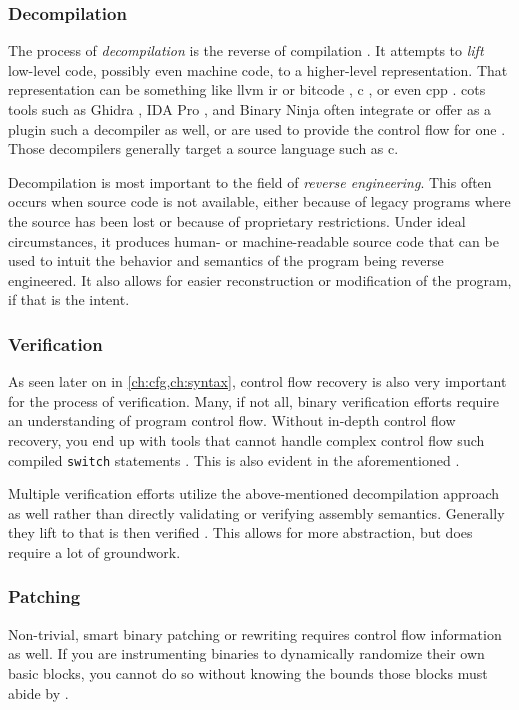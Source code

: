 \subsubsection{Decompilation}
The process of \emph{decompilation} is the reverse of compilation \autocite{cifuentes1994reverse}.
It attempts to \emph{lift} low-level code, possibly even machine code, to a higher-level representation.
That representation can be something like \gls{llvm} \ac{ir} or bitcode \autocite{dinaburg2014mcsema}, \gls{c} \autocite{brumley2013native}, or even \gls{cpp} \autocite{fokin2011smartdec}.
\Ac{cots} tools such as Ghidra \autocite{ghidra}, IDA Pro \autocite{ida-decompiler}, and Binary Ninja \autocite{binary-ninja-decompiler} often integrate or offer as a plugin such a decompiler as well, or are used to provide the control flow for one \autocite{mcsema}.
Those decompilers generally target a source language such as \gls{c}.

Decompilation is most important to the field of \emph{reverse engineering}.
This often occurs when source code is not available, either because of legacy programs where the source has been lost or because of proprietary restrictions.
Under ideal circumstances, it produces human- or machine-readable source code that can be used to intuit the behavior and semantics of the program being reverse engineered.
It also allows for easier reconstruction or modification of the program, if that is the intent.

\subsubsection{Verification}
As seen later on in \cref{ch:cfg,ch:syntax}, control flow recovery is also very important for the process of verification.
Many, if not all, binary verification efforts require an understanding of program control flow.
Without in-depth control flow recovery, you end up with tools that cannot handle complex control flow such compiled \lstinline|switch| statements \autocite{myreen2008dil,tan2015auspice}.
This is also evident in the aforementioned .

Multiple verification efforts utilize the above-mentioned decompilation approach as well rather than directly validating or verifying assembly semantics.
Generally they lift to  that is then verified \autocite{myreen2007hoare,myreen2012dil,brumley2011bap}.
This allows for more abstraction, but does require a lot of groundwork.

\subsubsection{Patching}
Non-trivial, smart binary patching or rewriting requires control flow information as well.
If you are instrumenting binaries to dynamically randomize their own basic blocks, you cannot do so without knowing the bounds those blocks must abide by \autocite{wartell2012binary,kim2017revarm}.

